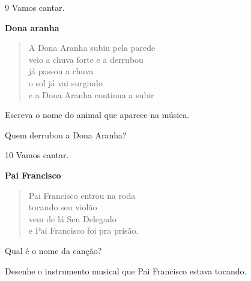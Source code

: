 \num{9} Vamos cantar.

\textbf{Dona aranha}

\begin{verse}
A Dona Aranha subiu pela parede\\
veio a chuva forte e a derrubou\\
já passou a chuva\\
o sol já vai surgindo\\
e a Dona Aranha continua a subir
\end{verse}


\begin{escolha}
\item Escreva o nome do animal que aparece na música.


\item Quem derrubou a Dona Aranha?


\end{escolha}

\num{10} Vamos cantar.

\textbf{Pai Francisco}

\begin{verse}
Pai Francisco entrou na roda\\
tocando seu violão\\
vem de lá Seu Delegado\\
e Pai Francisco foi pra prisão.
\end{verse}


\begin{escolha}
\item Qual é o nome da canção?


\item Desenhe o instrumento musical que Pai Francisco estava tocando.

\begin{mdframed}[linewidth=2pt,linecolor=salmao,roundcorner=10pt]
\vspace{5cm}
\end{mdframed}
\end{escolha}

